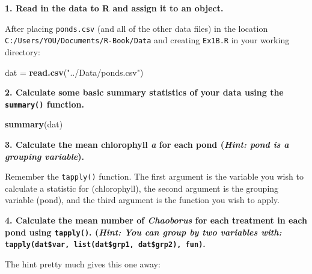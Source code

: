 \documentclass[]{book}
\newenvironment{Shaded}{\begin{snugshade}}{\end{snugshade}}
\newcommand{\KeywordTok}[1]{\textcolor[rgb]{0.13,0.29,0.53}{\textbf{#1}}}
\newcommand{\StringTok}[1]{\textcolor[rgb]{0.31,0.60,0.02}{#1}}
\newcommand{\OperatorTok}[1]{\textcolor[rgb]{0.81,0.36,0.00}{\textbf{#1}}}
\newcommand{\NormalTok}[1]{#1}
\theoremstyle{definition}
\theoremstyle{definition}
\theoremstyle{definition}
\theoremstyle{remark}
\begin{document}
\textbf{1. Read in the data to R and assign it to an object.}

After placing \texttt{ponds.csv} (and all of the other data files) in
the location \texttt{C:/Users/YOU/Documents/R-Book/Data} and creating
\texttt{Ex1B.R} in your working directory:

\begin{Shaded}
\begin{Highlighting}[]
\NormalTok{dat =}\StringTok{ }\KeywordTok{read.csv}\NormalTok{(}\StringTok{"../Data/ponds.csv"}\NormalTok{)}
\end{Highlighting}
\end{Shaded}

\textbf{2. Calculate some basic summary statistics of your data using
the \texttt{summary()} function.}

\begin{Shaded}
\begin{Highlighting}[]
\KeywordTok{summary}\NormalTok{(dat)}
\end{Highlighting}
\end{Shaded}

\textbf{3. Calculate the mean chlorophyll \emph{a} for each pond
(\emph{Hint: pond is a grouping variable}).}

Remember the \texttt{tapply()} function. The first argument is the
variable you wish to calculate a statistic for (chlorophyll), the second
argument is the grouping variable (pond), and the third argument is the
function you wish to apply.

\begin{Shaded}
\end{Shaded}

\textbf{4. Calculate the mean number of \emph{Chaoborus} for each
treatment in each pond using \texttt{tapply()}. (\emph{Hint: You can
group by two variables with:}
\texttt{tapply(dat\$var,\ list(dat\$grp1,\ dat\$grp2),\ fun)}.}

The hint pretty much gives this one away:

\begin{Shaded}
\end{Shaded}
\end{document}
